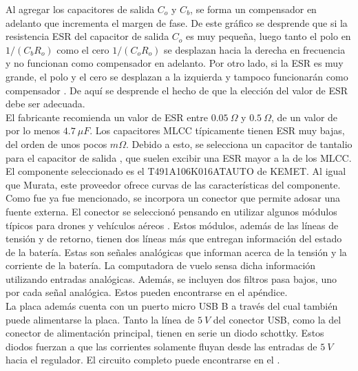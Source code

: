 Al agregar los capacitores de salida $C_o$ y $C_b$, se forma un compensador en adelanto que incrementa el margen de fase. De este gráfico se desprende que si la resistencia ESR del capacitor de salida $C_o$ es muy pequeña, luego tanto el polo en $1/(C_b R_o)$ como el cero $1/(C_o R_o)$ se desplazan hacia la derecha en frecuencia y no funcionan como compensador en adelanto. Por otro lado, si la ESR es muy grande, el polo y el cero se desplazan a la izquierda y tampoco funcionarán como compensador \cite{SLVA072}. De aquí se desprende el hecho de que la elección del valor de ESR debe ser adecuada.\\

El fabricante recomienda un valor de ESR entre $0.05 \ \Omega$ y $0.5 \  \Omega$, de un valor de por lo menos $4.7 \ \mu F$. Los capacitores MLCC típicamente tienen ESR muy bajas, del orden de unos pocos $m \Omega$. Debido a esto, se selecciona un capacitor de tantalio para el capacitor de salida \cite{AN1482}, que suelen excibir una ESR mayor a la de los MLCC. El componente seleccionado es el T491A106K016ATAUTO de KEMET. Al igual que Murata, este proveedor ofrece curvas de las características del componente.\\

Como fue ya fue mencionado, se incorpora un conector que permite adosar una fuente externa. El conector se seleccionó pensando en utilizar algunos módulos típicos para drones y vehículos aéreos \cite{HolybroPM02PowerModule}. Estos módulos, además de las líneas de tensión y de retorno, tienen dos líneas más que entregan información del estado de la batería. Estas son señales analógicas que informan acerca de la tensión y la corriente de la batería. La computadora de vuelo sensa dicha información utilizando entradas analógicas. Además, se incluyen dos filtros pasa bajos, uno por cada señal analógica. Estos pueden encontrarse en el apéndice.\\

La placa además cuenta con un puerto micro USB B a través del cual también puede alimentarse la placa. Tanto la línea de $5 \ V$ del conector USB, como la del conector de alimentación principal, tienen en serie un diodo schottky. Estos diodos fuerzan a que las corrientes solamente fluyan desde las entradas de $5 \ V$ hacia el regulador. El circuito completo puede encontrarse en el .\\

